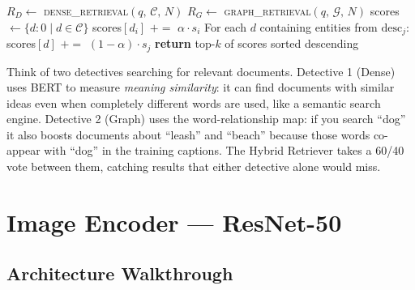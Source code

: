 \documentclass[12pt, a4paper]{article}
\theoremstyle{definition}
\theoremstyle{plain}
\theoremstyle{remark}
\begin{document}
\begin{algorithm}[H]
\caption{Full Hybrid Retrieve}
\label{alg:hybrid}
\begin{algorithmic}[1]
  \State $R_D \gets$ \textsc{dense\_retrieval}$(q,\,\mathcal{C},\,N)$
  \State $R_G \gets$ \textsc{graph\_retrieval}$(q,\,\mathcal{G},\,N)$
  \State scores $\gets \{d: 0 \mid d \in \mathcal{C}\}$
    \State scores$[d_i]$ $\mathrel{+}=$ $\alpha \cdot s_i$
  \EndFor
    \State For each $d$ containing entities from $\text{desc}_j$:\;
           scores$[d]$ $\mathrel{+}=$ $(1-\alpha)\cdot s_j$
  \EndFor
  \State \textbf{return} top-$k$ of scores sorted descending
\EndProcedure
\end{algorithmic}
\end{algorithm}

\begin{tcolorbox}[layman]
Think of two detectives searching for relevant documents.  Detective 1
(Dense) uses BERT to measure \emph{meaning similarity}: it can find
documents with similar ideas even when completely different words are used,
like a semantic search engine.  Detective 2 (Graph) uses the word-relationship
map: if you search ``dog'' it also boosts documents about ``leash'' and
``beach'' because those words co-appear with ``dog'' in the training captions.
The Hybrid Retriever takes a 60/40 vote between them, catching results
that either detective alone would miss.
\end{tcolorbox}

\section{Image Encoder --- ResNet-50}
\label{sec:resnet}

\subsection{Architecture Walkthrough}
\end{document}
